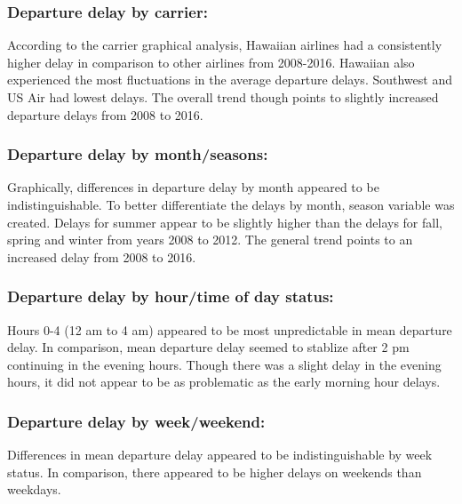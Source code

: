 \documentclass[12pt,twoside]{amherstthesis}
\begin{document}
  \subsubsection{Departure delay by
  carrier:}\label{departure-delay-by-carrier}
  
  According to the carrier graphical analysis, Hawaiian airlines had a
  consistently higher delay in comparison to other airlines from
  2008-2016. Hawaiian also experienced the most fluctuations in the
  average departure delays. Southwest and US Air had lowest delays. The
  overall trend though points to slightly increased departure delays from
  2008 to 2016.
  
  \subsubsection{Departure delay by
  month/seasons:}\label{departure-delay-by-monthseasons}
  
  Graphically, differences in departure delay by month appeared to be
  indistinguishable. To better differentiate the delays by month, season
  variable was created. Delays for summer appear to be slightly higher
  than the delays for fall, spring and winter from years 2008 to 2012. The
  general trend points to an increased delay from 2008 to 2016.
  
  \subsubsection{Departure delay by hour/time of day
  status:}\label{departure-delay-by-hourtime-of-day-status}
  
  Hours 0-4 (12 am to 4 am) appeared to be most unpredictable in mean
  departure delay. In comparison, mean departure delay seemed to stablize
  after 2 pm continuing in the evening hours. Though there was a slight
  delay in the evening hours, it did not appear to be as problematic as
  the early morning hour delays.
  
  \subsubsection{Departure delay by
  week/weekend:}\label{departure-delay-by-weekweekend}
  
  Differences in mean departure delay appeared to be indistinguishable by
  week status. In comparison, there appeared to be higher delays on
  weekends than weekdays.
  
  \clearpage
  
\end{document}
